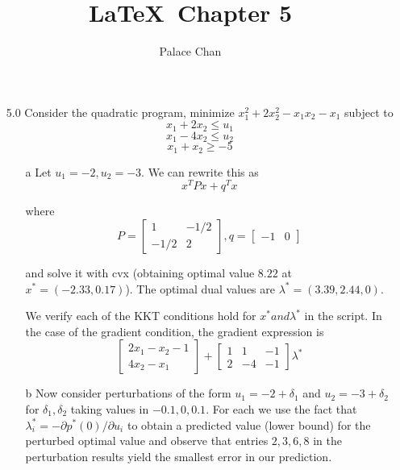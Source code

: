 \documentclass[12pt]{article}
\title{\LaTeX\ Chapter 5}
\author{Palace Chan}
\begin{document}
\maketitle
\newpage

\begin{itemize}

\item[5.0] Consider the quadratic program, minimize $x_1^2 + 2x_2^2 - x_1x_2 - x_1$ subject to
  $$x_1 + 2x_2 \leq u_1$$
  $$x_1 - 4x_2 \leq u_2$$
  $$x_1 + x_2 \geq -5$$

  \begin{enumerate}
  \item[a] Let $u_1 = -2, u_2 = -3$. We can rewrite this as
    $$x^T P x + q^T x$$

    where
    $$P = \begin{bmatrix}
      1 & -1/2 \\
      -1/2 & 2
    \end{bmatrix},
    q = \begin{bmatrix}
      -1 & 0
    \end{bmatrix}
    $$

    and solve it with cvx (obtaining optimal value $8.22$ at $x^* = (-2.33,  0.17)$). The optimal dual values are $\lambda^* = (3.39, 2.44, 0)$.

    We verify each of the KKT conditions hold for $x^* and \lambda^*$ in the script. In the case of the gradient condition, the gradient expression is
    $$\begin{bmatrix}
      2x_1 - x_2 - 1 \\
      4x_2 - x_1
    \end{bmatrix} + \begin{bmatrix}
      1 & 1 & -1 \\
      2 & -4 & -1
    \end{bmatrix} \lambda^*$$

  \item[b] Now consider perturbations of the form $u_1 = -2 + \delta_1$ and $u_2 = -3 + \delta_2$ for $\delta_1, \delta_2$ taking values in ${-0.1, 0, 0.1}$. For each we use the fact that $\lambda_i^* = - \partial p^*(0)/\partial u_i$ to obtain a predicted value (lower bound) for the perturbed optimal value and observe that entries $2,3,6,8$ in the perturbation results yield the smallest error in our prediction.
  \end{enumerate}


\end{itemize}
\end{document}
